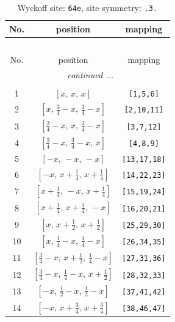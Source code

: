\documentclass[fleqn,8pt]{jsarticle}
\begin{document}
\begin{longtable}{ccc}
\caption{Wyckoff site: {\tt 64e}, site symmetry: {\tt .3.}}
 \\
 \hline \hline
No. & position & mapping \\ \hline \endfirsthead

\multicolumn{2}{l}{\tablename\ \thetable{}} \\
 \hline \hline
No. & position & mapping \\ \hline \endhead

 \hline \hline
\multicolumn{2}{r}{\footnotesize\it continued ...} \\ \endfoot

 \hline \hline
\multicolumn{2}{r}{} \\ \endlastfoot

1 & $\left[ x,\, x,\, x \right]$ & {\tt [1,5,6]} \\ \hline
2 & $\left[ x,\, \frac{3}{4} - x,\, \frac{3}{4} - x \right]$ & {\tt [2,10,11]} \\ \hline
3 & $\left[ \frac{3}{4} - x,\, x,\, \frac{3}{4} - x \right]$ & {\tt [3,7,12]} \\ \hline
4 & $\left[ \frac{3}{4} - x,\, \frac{3}{4} - x,\, x \right]$ & {\tt [4,8,9]} \\ \hline
5 & $\left[ - x,\, - x,\, - x \right]$ & {\tt [13,17,18]} \\ \hline
6 & $\left[ - x,\, x + \frac{1}{4},\, x + \frac{1}{4} \right]$ & {\tt [14,22,23]} \\ \hline
7 & $\left[ x + \frac{1}{4},\, - x,\, x + \frac{1}{4} \right]$ & {\tt [15,19,24]} \\ \hline
8 & $\left[ x + \frac{1}{4},\, x + \frac{1}{4},\, - x \right]$ & {\tt [16,20,21]} \\ \hline
9 & $\left[ x,\, x + \frac{1}{2},\, x + \frac{1}{2} \right]$ & {\tt [25,29,30]} \\ \hline
10 & $\left[ x,\, \frac{1}{4} - x,\, \frac{1}{4} - x \right]$ & {\tt [26,34,35]} \\ \hline
11 & $\left[ \frac{3}{4} - x,\, x + \frac{1}{2},\, \frac{1}{4} - x \right]$ & {\tt [27,31,36]} \\ \hline
12 & $\left[ \frac{3}{4} - x,\, \frac{1}{4} - x,\, x + \frac{1}{2} \right]$ & {\tt [28,32,33]} \\ \hline
13 & $\left[ - x,\, \frac{1}{2} - x,\, \frac{1}{2} - x \right]$ & {\tt [37,41,42]} \\ \hline
14 & $\left[ - x,\, x + \frac{3}{4},\, x + \frac{3}{4} \right]$ & {\tt [38,46,47]} \\ \hline

\end{longtable}
\end{document}
